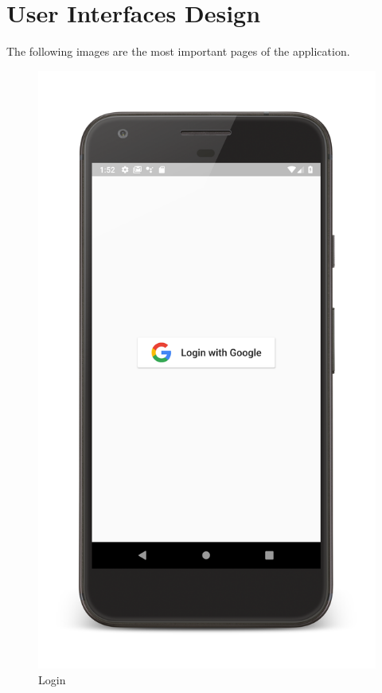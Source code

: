 \section{User Interfaces Design}
The following images are the most important pages of the application.\\
\begin{figure}[!htb]
    \begin{minipage}[b]{0.3\textwidth}
        \includegraphics[scale=0.09]{images/login-page.png}
        \caption{Login}

\end{minipage}
\end{figure}
